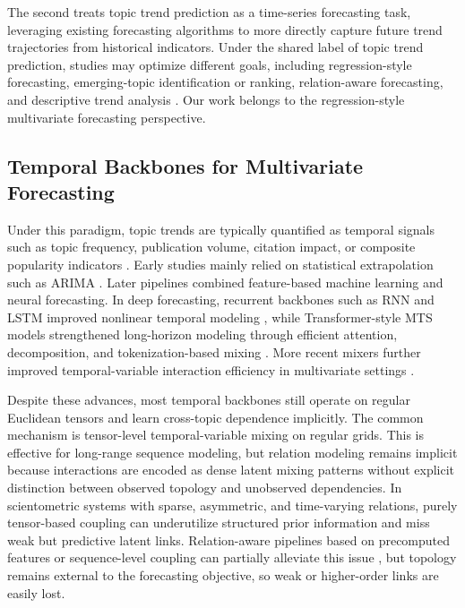 \documentclass[runningheads]{llncs}
\begin{document}
The second treats topic trend prediction as a time-series forecasting task, leveraging existing forecasting algorithms to more directly capture future trend trajectories from historical indicators. Under the shared label of topic trend prediction, studies may optimize different goals, including regression-style forecasting, emerging-topic identification or ranking, relation-aware forecasting, and descriptive trend analysis \cite{xu2022scientific,chen2018modeling,rahimi2023atem,liang2021combining,chi2022incorporating,zheng_research_2022}. Our work belongs to the regression-style multivariate forecasting perspective.

\subsection{Temporal Backbones for Multivariate Forecasting}
Under this paradigm, topic trends are typically quantified as temporal signals such as topic frequency, publication volume, citation impact, or composite popularity indicators \cite{xu2022scientific,chen2018modeling,wang2025knowledge,rahimi2023atem,liang2021combining}. Early studies mainly relied on statistical extrapolation such as ARIMA \cite{zou2024research,abuhay2018towards}. Later pipelines combined feature-based machine learning and neural forecasting. In deep forecasting, recurrent backbones such as RNN and LSTM improved nonlinear temporal modeling \cite{lu2019evolutionary,xu2022scientific}, while Transformer-style MTS models strengthened long-horizon modeling through efficient attention, decomposition, and tokenization-based mixing \cite{zhou2021informer,wu2021autoformer,nie2022time,zhang2023crossformer}. More recent mixers further improved temporal-variable interaction efficiency in multivariate settings \cite{wang2024timemixer,wang2024timexer}.

Despite these advances, most temporal backbones still operate on regular Euclidean tensors and learn cross-topic dependence implicitly. The common mechanism is tensor-level temporal-variable mixing on regular grids. This is effective for long-range sequence modeling, but relation modeling remains implicit because interactions are encoded as dense latent mixing patterns without explicit distinction between observed topology and unobserved dependencies. In scientometric systems with sparse, asymmetric, and time-varying relations, purely tensor-based coupling can underutilize structured prior information and miss weak but predictive latent links. Relation-aware pipelines based on precomputed features or sequence-level coupling can partially alleviate this issue \cite{chi2022incorporating,zheng_research_2022}, but topology remains external to the forecasting objective, so weak or higher-order links are easily lost.
\end{document}
